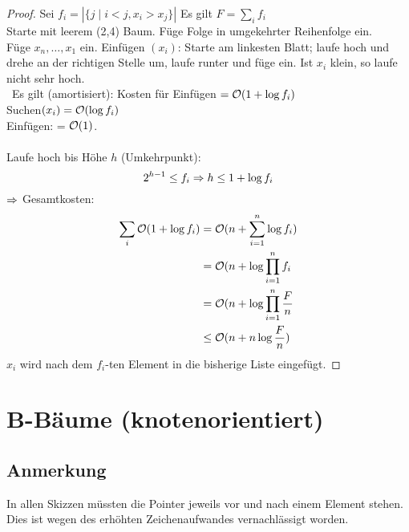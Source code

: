             \begin{proof}
                Sei $f_i = |\{ j \mid i < j , x_i > x_j \}|$ Es gilt $F= \sum \limits_{i} f_i$ \\
                Starte mit leerem (2,4) Baum. Füge Folge in umgekehrter Reihenfolge ein. \\
                
                Füge $x_n, \ldots, x_1$ ein. Einfügen $(x_i)$: Starte am linkesten Blatt; laufe hoch und drehe an der richtigen Stelle um,
                laufe runter und füge ein. Ist $x_i$ klein, so laufe nicht sehr hoch. \\\
                Es gilt (amortisiert): Kosten für Einfügen $= \mathcal{O}(1 + \log f_i)$ \\
                Suchen$(x_i) = \mathcal{O}(\log f_i)$ \\
                Einfügen: = $\mathcal{O}(1)$. \\\\
                Laufe hoch bis Höhe $h$ (Umkehrpunkt): \\
                $$2^{h-1} \leq f_i \Ra h \leq 1 + \log f_i$$
                $\Ra$ Gesamtkosten: 
                \begin{align*}
                		\sum \limits_{i} \mathcal{O}(1+ \log f_i) 	&= \mathcal{O}(n + \sum \limits_{i=1}^n \log f_i) \\
                									&= \mathcal{O}(n+\log \prod \limits_{i=1}^n f_i\\
                									&= \mathcal{O}(n+\log \prod \limits_{i=1}^n \frac{F}{n}\\
                									&\leq \mathcal{O}(n + n \log \frac{F}{n})
                \end{align*}
                $x_i$ wird nach dem $f_i$-ten Element in die bisherige Liste eingefügt.
            \end{proof}
        
        
        
    \section{B-Bäume (knotenorientiert)}
        \subsection*{Anmerkung}
            In allen Skizzen müssten die Pointer jeweils vor und nach einem Element stehen. Dies ist wegen des erhöhten Zeichenaufwandes vernachlässigt worden.
            
